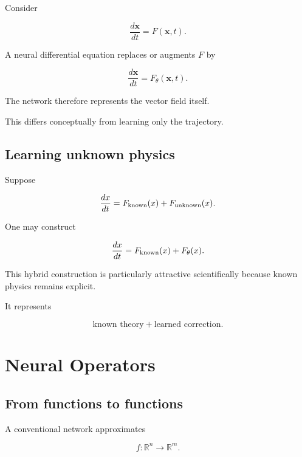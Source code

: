 \documentclass[11pt,a4paper,oneside]{book}
\newcommand{\R}{\mathbb{R}}
\begin{document}
Consider

\begin{equation}
\frac{d\mathbf{x}}{dt}
=
F(\mathbf{x},t).
\end{equation}

A neural differential equation replaces or augments $F$ by

\begin{equation}
\frac{d\mathbf{x}}{dt}
=
F_\theta(\mathbf{x},t).
\end{equation}

The network therefore represents the vector field itself.

This differs conceptually from learning only the trajectory.

\section{Learning unknown physics}

Suppose

\begin{equation}
\frac{d x}{dt}
=
F_{\rm known}(x)
+
F_{\rm unknown}(x).
\end{equation}

One may construct

\begin{equation}
\frac{dx}{dt}
=
F_{\rm known}(x)
+
F_\theta(x).
\end{equation}

This hybrid construction is particularly attractive scientifically because
known physics remains explicit.

It represents

\begin{equation}
\boxed{
\text{known theory}
+
\text{learned correction}.
}
\end{equation}

\chapter{Neural Operators}

\section{From functions to functions}

A conventional network approximates

\begin{equation}
f:\R^n\rightarrow\R^m.
\end{equation}
\end{document}
